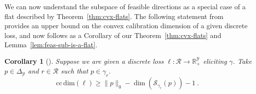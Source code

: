 \documentclass{article}
\newcommand{\reals}{\mathbb{R}}
\newcommand{\simplex}{\Delta_\Y}
\newcommand{\ccdim}{\mathrm{cc\,dim}}
\newcommand{\R}{\mathcal{R}}
\renewcommand{\S}{\mathcal{S}}
\newcommand{\Y}{\mathcal{Y}}
\newtheorem{corollary}{Corollary}
\begin{document}
We can now understand the subspace of feasible directions as a special case of a flat described by Theorem~\ref{thm:cvx-flats}.
The following statement from~\cite{ramaswamy2016convex} provides an upper bound on the convex calibration dimension of a given discrete loss, and now follows as a Corollary of our Theorem~\ref{thm:cvx-flats} and Lemma~\ref{lem:feas-sub-is-a-flat}.

\begin{corollary}[\cite{ramaswamy2016convex}]\label{cor:fsd-bound}
	Suppose we are given a discrete loss $\ell:\R \to \reals^\Y_+$ eliciting $\gamma$.
	Take $p \in \simplex$ and $r \in \R$ such that $p \in \gamma_r$.
	\begin{equation}
	\ccdim(\ell) \geq \|p\|_0 - \dim(\S_{\gamma_r}(p)) - 1~.~
	\end{equation}
\end{corollary}
\end{document}
